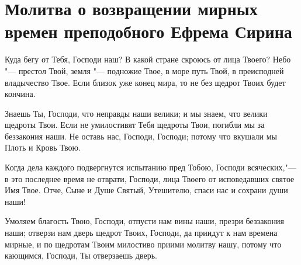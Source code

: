 \section{Молитва о возвращении мирных времен преподобного Ефрема Сирина}\begin{mymulticols}
 

Куда бегу от Тебя, Господи наш? В какой стране скроюсь от лица Твоего? Небо "--- престол Твой, земля "--- подножие Твое, в море путь Твой, в преисподней владычество Твое. Если близок уже конец мира, то не без щедрот Твоих будет кончина. 

Знаешь Ты, Господи, что неправды наши велики; и мы знаем, что велики щедроты Твои. Если не умилостивят Тебя щедроты Твои, погибли мы за беззакония наши. Не оставь нас, Господи, Господи; потому что вкушали мы Плоть и Кровь Твою. 

Когда дела каждого подвергнутся испытанию пред Тобою, Господи всяческих,"--- в это последнее время не отврати, Господи, лица Твоего от исповедавших святое Имя Твое. Отче, Сыне и Душе Святый, Утешителю, спаси нас и сохрани души наши! 

Умоляем благость Твою, Господи, отпусти нам вины наши, презри беззакония наши; отверзи нам дверь щедрот Твоих, Господи, да приидут к нам времена мирные, и по щедротам Твоим милостиво приими молитву нашу, потому что кающимся, Господи, Ты отверзаешь дверь.

\end{mymulticols}

\mychapterending

